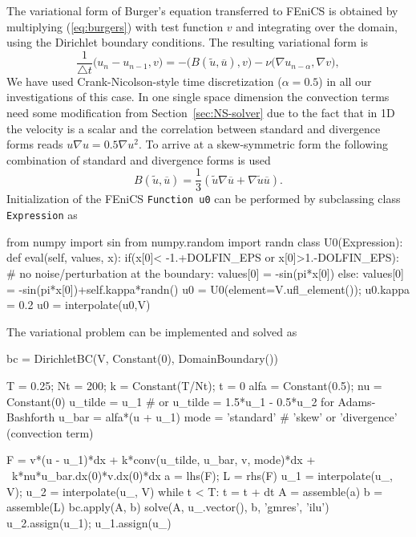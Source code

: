 The variational form of Burger's equation transferred to FEniCS is obtained by multiplying (\ref{eq:burgers}) with test function $v$ and integrating over the domain, using the Dirichlet boundary conditions. The resulting variational form is
\begin{equation}
 \frac{1}{\triangle t}\bigl( u_{n} - u_{n-1} , v\bigr) = - \bigl(B(\tilde{u},\overline{u}), v \bigr) - \nu \bigl( \nabla u_{n-\alpha}, \nabla v \bigr),
\label{eq:burgers_vf}
\end{equation}
We have used Crank-Nicolson-style time discretization ($\alpha=0.5$) in all our investigations of this case. In one single space dimension the convection terms need some modification from Section~\ref{sec:NS-solver} due to the fact that in 1D the velocity is a scalar and the correlation between standard and divergence forms reads $u\nabla u =0.5 \nabla u^2$. To arrive at a skew-symmetric form the following combination of standard and divergence forms is used
\begin{equation}
 B(\tilde{u},\overline{u}) = \frac{1}{3}\left( \tilde{u}\nabla \overline{u} + \nabla \tilde{u} \overline{u} \right).
\end{equation}
Initialization of the FEniCS
{\fontsize{12pt}{12pt}\texttt{Function u0}} can be performed by subclassing  class
{\fontsize{12pt}{12pt}\texttt{Expression}} as
\begin{python}
from numpy import sin
from numpy.random import randn
class U0(Expression):
    def eval(self, values, x):
        if(x[0]< -1.+DOLFIN_EPS or x[0]>1.-DOLFIN_EPS):
            # no noise/perturbation at the boundary:
            values[0] = -sin(pi*x[0])
        else:
            values[0] = -sin(pi*x[0])+self.kappa*randn()
u0 = U0(element=V.ufl_element()); u0.kappa = 0.2
u0 = interpolate(u0,V)
\end{python}
The variational problem can be implemented and solved as
\begin{python}
bc = DirichletBC(V, Constant(0), DomainBoundary())

T = 0.25; Nt = 200; k = Constant(T/Nt); t = 0
alfa = Constant(0.5); nu = Constant(0)
u_tilde = u_1 # or u_tilde = 1.5*u_1 - 0.5*u_2 for Adams-Bashforth
u_bar = alfa*(u + u_1)
mode = 'standard'  # 'skew' or 'divergence' (convection term)

F = v*(u - u_1)*dx + k*conv(u_tilde, u_bar, v, mode)*dx + \
    k*nu*u_bar.dx(0)*v.dx(0)*dx
a = lhs(F); L = rhs(F)
u_1 = interpolate(u_, V); u_2 = interpolate(u_, V)
while t < T:
    t = t + dt
    A = assemble(a)
    b = assemble(L)
    bc.apply(A, b)
    solve(A, u_.vector(), b, 'gmres', 'ilu')
    u_2.assign(u_1); u_1.assign(u_)
\end{python}


